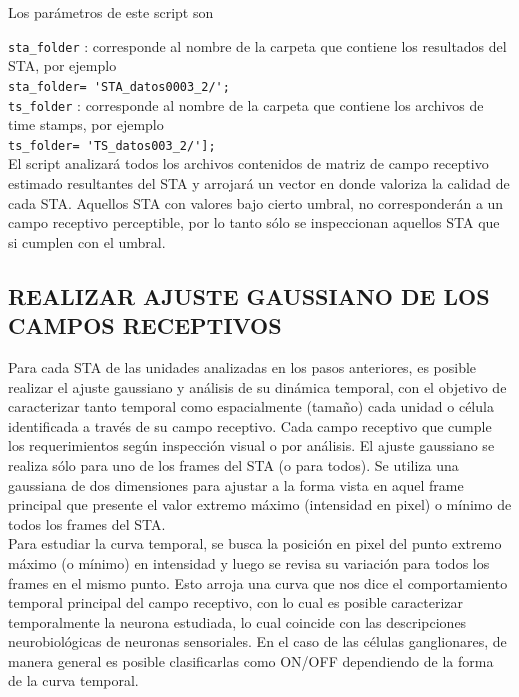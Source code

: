 \documentclass[10pt]{article}
\begin{document}
Los parámetros de este script son

\verb+sta_folder+ : corresponde al nombre de la carpeta que contiene los resultados del STA, por ejemplo \\

\verb+sta_folder= 'STA_datos0003_2/';+ \\

\verb+ts_folder+ : corresponde al nombre de la carpeta que contiene los archivos de  time stamps, por ejemplo \\

\verb+ts_folder= 'TS_datos003_2/'];+ \\

El script analizará todos los archivos contenidos de matriz de campo receptivo estimado resultantes del STA y arrojará un vector en donde valoriza la calidad de cada STA. Aquellos STA con valores bajo cierto umbral, no corresponderán a un campo receptivo perceptible, por lo tanto sólo se inspeccionan aquellos STA que si cumplen con el umbral.

\newpage

\subsection{ REALIZAR AJUSTE GAUSSIANO DE LOS CAMPOS RECEPTIVOS }

Para cada STA de las unidades analizadas en los pasos anteriores, es posible realizar el ajuste gaussiano y análisis de su dinámica temporal, con el objetivo de caracterizar tanto temporal como espacialmente (tamaño) cada unidad o célula identificada a través de su campo receptivo. Cada campo receptivo que cumple los requerimientos según inspección visual o por análisis. El ajuste gaussiano se realiza sólo para uno de los frames del STA (o para todos). Se utiliza una gaussiana de dos dimensiones para ajustar a la forma vista en aquel frame principal que presente el valor extremo máximo (intensidad en pixel) o mínimo de todos los frames del STA. \\

Para estudiar la curva temporal, se busca la posición en pixel del punto extremo máximo (o mínimo) en intensidad y luego se revisa su variación para todos los frames en el mismo punto. Esto arroja una curva que nos dice el comportamiento temporal principal del campo receptivo, con lo cual es posible caracterizar temporalmente la neurona estudiada, lo cual coincide con las descripciones neurobiológicas de neuronas sensoriales. En el caso de las células ganglionares, de manera general es posible clasificarlas como ON/OFF dependiendo de la forma de la curva temporal.\\
\end{document}
